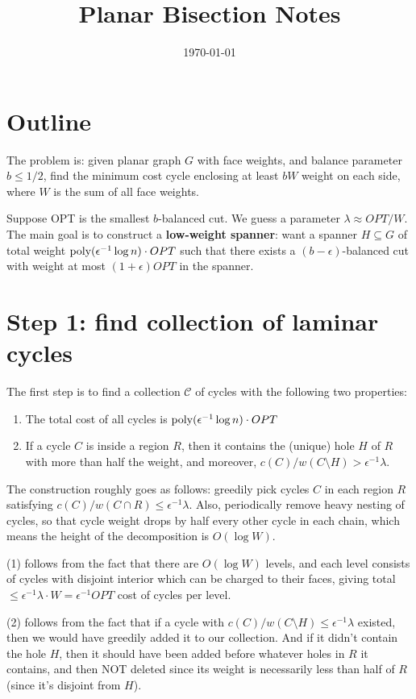 \documentclass{article}
\begin{document}
\title{Planar Bisection Notes}
\date{\today}
\maketitle


\section{Outline}

The problem is: given planar graph $G$ with face weights, and balance parameter $b\le1/2$, find the minimum cost cycle enclosing at least $bW$ weight on each side, where $W$ is the sum of all face weights.

Suppose OPT is the smallest $b$-balanced cut. We guess a parameter $\lambda\approx OPT/W$. The main goal is to construct a \textbf{low-weight spanner}: want a spanner $H\subseteq G$ of total weight $\textup{poly}(\epsilon^{-1}\log n)\cdot OPT$ such that there exists a $(b-\epsilon)$-balanced cut with weight at most $(1+\epsilon)OPT$ in the spanner.

\section{Step 1: find collection of laminar cycles}
The first step is to find a collection $\mathcal C$ of cycles with the following two properties:
 \begin{enumerate}
 \item The total cost of all cycles is $\textup{poly}(\epsilon^{-1}\log n)\cdot OPT$
 \item If a cycle $C$ is inside a region $R$, then it contains the (unique) hole $H$ of $R$ with more than half the weight, and moreover, $c(C)/w(C\setminus H) > \epsilon^{-1}\lambda$.
 \end{enumerate}

The construction roughly goes as follows: greedily pick cycles $C$ in each region $R$ satisfying $c(C)/w(C\cap R)\le\epsilon^{-1}\lambda$. Also, periodically remove heavy nesting of cycles, so that cycle weight drops by half every other cycle in each chain, which means the height of the decomposition is $O(\log W)$.

(1) follows from the fact that there are $O(\log W)$ levels, and each level consists of cycles with disjoint interior which can be charged to their faces, giving total $\le \epsilon^{-1}\lambda\cdot W=\epsilon^{-1} OPT$ cost of cycles per level. 

(2) follows from the fact that if a cycle with $c(C)/w(C\setminus H)\le\epsilon^{-1}\lambda$ existed, then we would have greedily added it to our collection. And if it didn't contain the hole $H$, then it should have been added before whatever holes in $R$ it contains, and then NOT deleted since its weight is necessarily less than half of $R$ (since it's disjoint from $H$).
\end{document}
